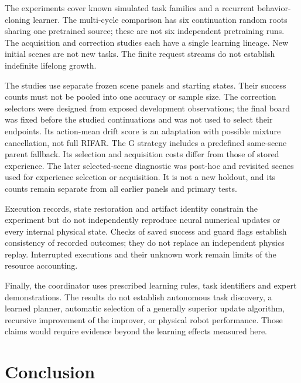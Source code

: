 \documentclass[10pt,letterpaper]{article}
\begin{document}
The experiments cover known simulated task families and a recurrent
behavior-cloning learner. The multi-cycle comparison has six
continuation random roots sharing one pretrained source; these are not
six independent pretraining runs. The acquisition and correction studies
each have a single learning lineage. New initial scenes are not new
tasks. The finite request streams do not establish indefinite lifelong
growth.

The studies use separate frozen scene panels and starting states. Their
success counts must not be pooled into one accuracy or sample size. The
correction selectors were designed from exposed development
observations; the final board was fixed before the studied continuations
and was not used to select their endpoints. Its action-mean drift score
is an adaptation with possible mixture cancellation, not full RIFAR. The
G strategy includes a predefined same-scene parent fallback. Its
selection and acquisition costs differ from those of stored experience.
The later selected-scene diagnostic was post-hoc and revisited scenes
used for experience selection or acquisition. It is not a new holdout,
and its counts remain separate from all earlier panels and primary
tests.

Execution records, state restoration and artifact identity constrain the
experiment but do not independently reproduce neural numerical updates
or every internal physical state. Checks of saved success and guard
flags establish consistency of recorded outcomes; they do not replace an
independent physics replay. Interrupted executions and their unknown
work remain limits of the resource accounting.

Finally, the coordinator uses prescribed learning rules, task
identifiers and expert demonstrations. The results do not establish
autonomous task discovery, a learned planner, automatic selection of a
generally superior update algorithm, recursive improvement of the
improver, or physical robot performance. Those claims would require
evidence beyond the learning effects measured here.

\section{Conclusion}\label{conclusion}
\end{document}
